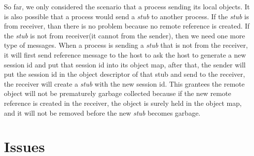 So far, we only considered the scenario that a process sending its local
objects.
It is also possible that a process would send a \emph{stub} to another process.
If the \emph{stub} is from receiver, than there is no problem because no remote
reference is created.
If the \emph{stub} is not from receiver(it cannot from the sender),
then we need one more type of messages.
When a process is sending a \emph{stub} that is not from the receiver,
it will first send reference message to the host to ask the host
to generate a new session id and put that session id into its object map,
after that, the sender will put the session id in the object descriptor of that 
stub and send to the receiver,
the receiver will create a \emph{stub} with the new session id.
This grantees the remote object will not be prematurely garbage collected 
because if the new remote reference is created in the receiver,
the object is surely held in the object map,
and it will not be removed before the new \emph{stub} becomes garbage.





\section{Issues}

